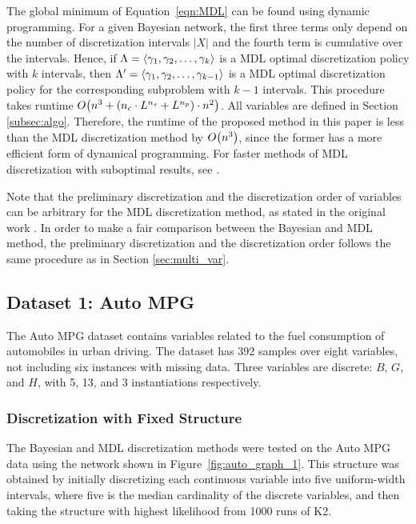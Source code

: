 The global minimum of Equation~\ref{eqn:MDL} can be found using dynamic programming.
For a given Bayesian network, the first three terms only depend on the number of discretization intervals $|X|$ and the fourth term is cumulative over the intervals.
Hence, if $\Lambda = \langle \gamma_1, \gamma_2, \ldots, \gamma_k \rangle$ is a MDL optimal discretization policy with $k$ intervals, then $\Lambda' = \langle \gamma_1, \gamma_2, \ldots, \gamma_{k-1} \rangle$ is a MDL optimal discretization policy for the corresponding subproblem with $k-1$ intervals.
This procedure takes runtime $\bigo \paren{ n^3 + \paren{ n_c \cdot {L}^{n_s}  + {L}^{n_p}} \cdot n^2 }$.
All variables are defined in Section \ref{subsec:algo}.
Therefore, the runtime of the proposed method in this paper is less than the MDL discretization method by $\bigo \paren{n^3}$, since the former has a more efficient form of dynamical programming.
For faster methods of MDL discretization with suboptimal results, see \citet{Friedman_1996}.

Note that the preliminary discretization and the discretization order of variables can be arbitrary for the MDL discretization method, as stated in the original work \citep{Friedman_1996}. In order to make a fair comparison between the Bayesian and MDL method, the preliminary discretization and the discretization order follows the same procedure as in Section \ref{sec:multi_var}.

\subsection{Dataset 1: Auto MPG}
\label{subsec:auto}

The Auto MPG dataset contains variables related to the fuel consumption of automobiles in urban driving.
The dataset has \num{392} samples over eight variables, not including six instances with missing data.
Three variables are discrete: $B$, $G$, and $H$, with \num{5}, \num{13}, and \num{3} instantiations respectively.

\subsubsection{Discretization with Fixed Structure}
\label{subsubsec:auto_exp1}

The Bayesian and MDL discretization methods were tested on the Auto MPG data using the network shown in Figure~\ref{fig:auto_graph_1}.
This structure was obtained by initially discretizing each continuous variable into five uniform-width intervals, where five is the median cardinality of the discrete variables, and then taking the structure with highest likelihood from \num{1000} runs of K2.

